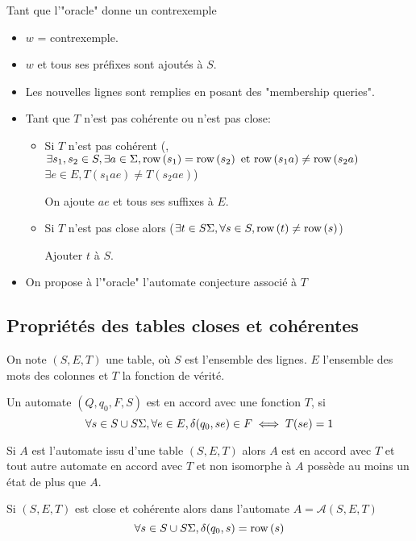 Tant que l'"oracle" donne un contrexemple
\begin{itemize}
	\item $w$ = contrexemple.
	\item $w$ et tous ses préfixes sont ajoutés à $S$.
	\item Les nouvelles lignes sont remplies en posant des "membership queries".
	\item Tant que $T$ n'est pas cohérente ou n'est pas close:
	      \begin{itemize}
		      \item Si $T$ n'est pas cohérent (\cad, $\exists s_1, s_2 \in S, \exists a \in \Sigma, \text{row}\left(s_1\right) = \text{row}\left(s_2\right) \text{ et } \text{row}\left(s_1a\right) \neq \text{row}\left(s_2a\right)$
		            \cad $\exists e \in E, T (s_1ae) \neq T(s_2ae)$)

		            On ajoute $ae$ et tous ses suffixes à $E$.
		      \item Si $T$ n'est pas close alors ($\exists t \in S \Sigma, \forall s \in S, \text{row}\left(t\right) \neq \text{row}\left(s\right)$)

		            Ajouter $t$ à $S$.
	      \end{itemize}
	\item On propose à l'"oracle" l'automate conjecture associé à $T$
\end{itemize}

\subsection{Propriétés des tables closes et cohérentes}

\begin{notation}
	On note $(S,E,T)$ une table, où $S$ est l'ensemble des lignes. $E$ l'ensemble des mots des colonnes et $T$ la fonction de vérité.
\end{notation}

\begin{definition}
	Un automate $(Q, q_0, F, S)$ est en accord avec une fonction $T$, si
	$$ \forall s \in S \cup S\Sigma, \forall e \in E, \delta(q_0,se) \in F \iff T(se) = 1$$
\end{definition}

\begin{theorem}
	Si $A$ est l'automate issu d'une table $(S,E,T)$ alors $A$ est en accord avec $T$ et tout autre
	automate en accord avec $T$ et non isomorphe à $A$ possède au moins un état de plus que $A$.
\end{theorem}

\begin{lemma} \label{lem:learning-9}
	Si $(S,E,T)$ est close et cohérente alors dans l'automate $A = \mathcal A (S,E,T)$
	$$\forall s \in S \cup S\Sigma, \delta(q_0,s) = \text{row}\left(s\right)$$
\end{lemma}


